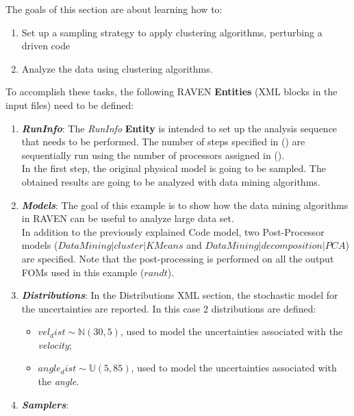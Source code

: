 The goals of this section are about learning how to:
 \begin{enumerate}
   \item Set up a sampling strategy to apply clustering algorithms, perturbing a driven code
  \item Analyze the data using clustering algorithms.
\end{enumerate}
To accomplish these tasks, the following RAVEN \textbf{Entities} (XML blocks in the input files) need to be defined:
\begin{enumerate}
   \item \textbf{\textit{RunInfo}}:
   The \textit{RunInfo} \textbf{Entity} is intended  to set up the analysis sequence that
   needs to be performed. The number of steps specified in () are sequentially run
   using the number of processors assigned in ().
   \\In the first step, the original physical model is going to be sampled.
   The obtained results are going to be analyzed with data mining
   algorithms.
   \item \textbf{\textit{Models}}:
 The goal of this example is to show how the
 data mining algorithms in RAVEN can be useful to analyze large data set.
 \\In addition to the previously explained Code model, two Post-Processor models ($DataMining|cluster|KMeans$ and $DataMining|decomposition|PCA$) are specified. Note that the post-processing is performed on all the output FOMs used in this example ($r and t$).
   \item \textbf{\textit{Distributions}}:
  In the Distributions XML section, the stochastic model for the
  uncertainties are reported. In this case 2 distributions are defined:
  \begin{itemize}
    \item $vel_dist \sim \mathbb{N}(30,5)$, used to model the uncertainties
    associated with  the \textit{velocity};
    \item  $angle_dist \sim \mathbb{U}(5,85)$,  used to
    model the uncertainties associated with the \textit{angle}.
  \end{itemize}
   \item \textbf{\textit{Samplers}}:

\end{enumerate}
